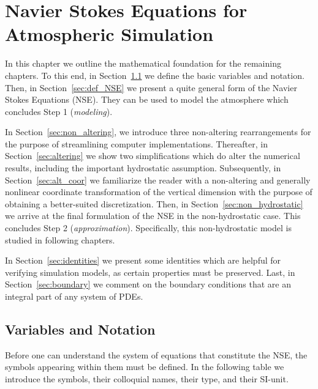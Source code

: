 \chapter{Navier Stokes Equations for Atmospheric Simulation}\label{chapter:navier_stokes}
In this chapter we outline the mathematical foundation for the remaining chapters.
To this end, in Section~\ref{sec:var_and_not} we define the basic variables and notation.
Then, in Section~\ref{sec:def_NSE} we present a quite general form of the Navier Stokes Equations (NSE).
They can be used to model the atmosphere which concludes Step 1 (\emph{modeling}).

In Section~\ref{sec:non_altering}, we introduce three non-altering rearrangements for the purpose of streamlining computer implementations.
Thereafter, in Section~\ref{sec:altering} we show two simplifications which do alter the numerical results, including the important hydrostatic assumption.
Subsequently, in Section~\ref{sec:alt_coor} we familiarize the reader with a non-altering and generally nonlinear coordinate transformation of the vertical dimension with the purpose of obtaining a better-suited discretization.
Then, in Section~\ref{sec:non_hydrostatic} we arrive at the final formulation of the NSE in the non-hydrostatic case.
This concludes Step 2 (\emph{approximation}).
Specifically, this non-hydrostatic model is studied in following chapters.

In Section~\ref{sec:identities} we present some identities which are helpful for verifying simulation models, as certain properties must be preserved.
Last, in Section~\ref{sec:boundary} we comment on the boundary conditions that are an integral part of any system of PDEs.

\newpage
\section{Variables and Notation}\label{sec:var_and_not}
Before one can understand the system of equations that constitute the NSE, the symbols appearing within them must be defined.
In the following table we introduce the symbols, their colloquial names, their type, and their SI-unit.\\\\

